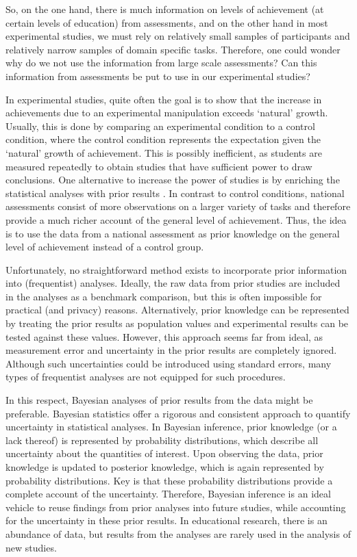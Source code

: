 \documentclass[man, mask]{apa7}
\begin{document}
So, on the one hand, there is much information on levels of achievement (at certain levels of education) from assessments, and on the other hand in most experimental studies, we must rely on relatively small samples of participants and relatively narrow samples of domain specific tasks. Therefore, one could wonder why do we not use the information from large scale assessments? Can this information from assessments be put to use in our experimental studies?

In experimental studies, quite often the goal is to show that the increase in achievements due to an experimental manipulation exceeds `natural' growth.
Usually, this is done by comparing an experimental condition to a control condition, where the control condition represents the expectation given the `natural' growth of achievement.
This is possibly inefficient, as students are measured repeatedly to obtain studies that have sufficient power to draw conclusions.
One alternative to increase the power of studies is by enriching the statistical analyses with prior results \parencite{rijlaarsdam2011application}.
In contrast to control conditions, national assessments consist of more observations on a larger variety of tasks and therefore provide a much richer account of the general level of achievement.
Thus, the idea is to use the data from a national assessment as prior knowledge on the general level of achievement instead of a control group.

Unfortunately, no straightforward method exists to incorporate prior information into (frequentist) analyses. 
Ideally, the raw data from prior studies are included in the analyses as a benchmark comparison, but this is often impossible for practical (and privacy) reasons.
Alternatively, prior knowledge can be represented by treating the prior results as population values and experimental results can be tested against these values.
However, this approach seems far from ideal, as measurement error and uncertainty in the prior results are completely ignored.
Although such uncertainties could be introduced using standard errors, many types of frequentist analyses are not equipped for such procedures.

In this respect, Bayesian analyses of prior results from the data might be preferable. Bayesian statistics offer a rigorous and consistent approach to quantify uncertainty in statistical analyses. In Bayesian inference, prior knowledge (or a lack thereof) is represented by probability distributions, which describe all uncertainty about the quantities of interest. Upon observing the data, prior knowledge is updated to posterior knowledge, which is again represented by probability distributions. Key is that these probability distributions provide a complete account of the uncertainty. Therefore, Bayesian inference is an ideal vehicle to reuse findings from prior analyses into future studies, while accounting for the uncertainty in these prior results. In educational research, there is an abundance of data, but results from the analyses are rarely used in the analysis of new studies.
\end{document}
